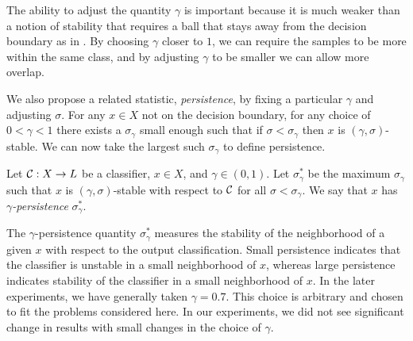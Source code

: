 The ability to adjust the quantity $\gamma$ is important because it is much weaker than a notion of stability that requires a ball that stays away from the decision boundary as in \cite{Khoury2018}. By choosing $\gamma$ closer to $1$, we can require the samples to be more within the same class, and by adjusting $\gamma$ to be smaller we can allow more overlap.

We also propose a related statistic, \emph{persistence}, by fixing a particular $\gamma$ and adjusting $\sigma$. For any $x\in X$ not on the decision boundary, for any choice of $0<\gamma<1$ there exists a $\sigma_\gamma$ small enough such that if $\sigma < \sigma_\gamma$ then $x$ is $(\gamma,\sigma)$-stable. We can now take the largest such $\sigma_\gamma$ to define persistence.



\begin{definition}
    Let $\mathcal{C}:X\to L$ be a classifier, $x \in X$, and $\gamma\in(0,1)$. Let $\sigma_\gamma^*$ be the maximum $\sigma_\gamma$ such that $x$ is $(\gamma, \sigma)$-stable with respect to $\mathcal{C}$ for all $\sigma<\sigma_\gamma$. We say that $x$ has \emph{$\gamma$-persistence} $\sigma_\gamma^*$.
\end{definition}

The $\gamma$-persistence quantity $\sigma_\gamma^*$ measures the stability of the neighborhood of a given $x$ with respect to the output classification. Small persistence indicates that the classifier is unstable in a small neighborhood of $x$, whereas large persistence indicates stability of the classifier in a small neighborhood of $x$. In the later experiments, we have generally taken $\gamma = 0.7$. This choice is arbitrary and chosen to fit the problems considered here. In our experiments, we did not see significant change in results with small changes in the choice of $\gamma$.






